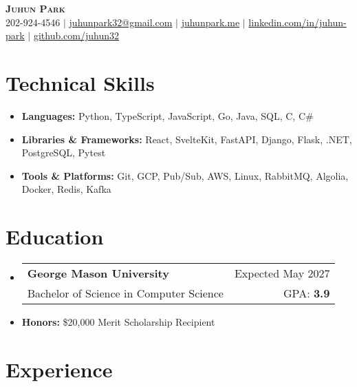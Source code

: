 \documentclass[letterpaper,11pt]{article}
\makeatletter
\newcommand{\resumeItem}[1]{
  \item{
    {#1}
  }
}
\newcommand{\resumeItemThin}[1]{
  \item{
    {#1 \vspace{-5pt}}
  }
}
\newcommand{\resumeSubheading}[4]{
    \item
    \begin{tabular*}{0.985\textwidth}[t]{l@{\extracolsep{\fill}}r@{\hspace{-0.1in}}}
        {\textbf{#1}} & {#2} \\
        #3 &  #4 \\
    \end{tabular*}\vspace{-5pt}
}
\newcommand{\resumeSubHeadingListStart}{\begin{itemize}[leftmargin=0.00in, rightmargin=-0.2in, label={}]\vspace{3pt}}
\newcommand{\resumeSubHeadingListEnd}{\end{itemize}\vspace{-5pt}}
\newcommand{\resumeItemListStart}{\vspace{3pt}\begin{itemize}[leftmargin=0.15in, rightmargin=0.15in]}
\newcommand{\resumeItemListEnd}{\end{itemize}\vspace{-5pt}}
\makeatother
\begin{document}

\begin{center}
  \textbf{\Huge \scshape {Juhun Park}} \\ \vspace{3pt}
   202-924-4546 $|$
  \href{mailto:juhunpark32@gmail.com}{juhunpark32@gmail.com} $|$
  \href{https://www.juhunpark.me/}{juhunpark.me} $|$
  \href{https://linkedin.com/in/juhun-park}{linkedin.com/in/juhun-park} $|$
  \href{https://github.com/juhun32}{github.com/juhun32} \\
\end{center}

\vspace{-10pt}


\section{Technical Skills}
\resumeItemListStart
\resumeItemThin{\textbf{Languages: }{Python, TypeScript, JavaScript, Go, Java, SQL, C, C\#}}\\
\resumeItemThin{\textbf{Libraries \& Frameworks: }{React, SvelteKit, FastAPI, Django, Flask, .NET, PostgreSQL, Pytest}}\\
\resumeItemThin{\textbf{Tools \& Platforms: }{Git, GCP, Pub/Sub, AWS, Linux, RabbitMQ, Algolia, Docker, Redis, Kafka}}\\
\resumeItemListEnd

\vspace{-5pt}


\section{Education}
\resumeSubHeadingListStart
\resumeSubheading
{George Mason University}{Expected May 2027}
{Bachelor of Science in Computer Science}{GPA: \textbf{3.9}}
\resumeItem{\textbf{Honors: }{\$20,000 Merit Scholarship Recipient}}
\resumeSubHeadingListEnd

\vspace{-10pt}


\section{Experience}
\end{document}
